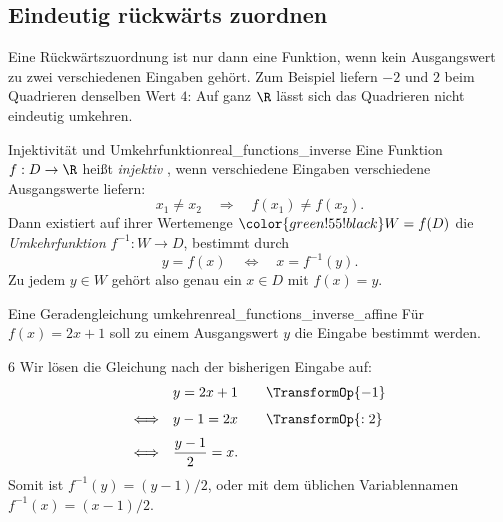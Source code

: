 \subsection{Eindeutig rückwärts zuordnen}
\label{subsec:real_functions_inverse_principle}
Eine Rückwärtszuordnung ist nur dann eine Funktion, wenn kein Ausgangswert
zu zwei verschiedenen Eingaben gehört. Zum Beispiel liefern $-2$ und $2$
beim Quadrieren denselben Wert $4$: Auf ganz $\R$ lässt sich das
Quadrieren nicht eindeutig umkehren.

\par\noindent\begin{minipage}{\linewidth}
\begin{FunctionPropertyBox}{Injektivität und Umkehrfunktion}{real_functions_inverse}
  Eine Funktion $f:D\to\R$ heißt \emph{injektiv} ,
  wenn verschiedene Eingaben verschiedene Ausgangswerte liefern:
  \[
    x_1\ne x_2\quad\Longrightarrow\quad f(x_1)\ne f(x_2).
  \]
  Dann existiert auf ihrer \textcolor{green!55!black}{Wertemenge} ${\color{green!55!black}W}=f(D)$ die
  \emph{Umkehrfunktion} 
  $f^{-1}:W\to D$, bestimmt durch
  \[
    y=f(x)\quad\Longleftrightarrow\quad x=f^{-1}(y).
  \]
  Zu jedem $y\in W$ gehört also genau ein $x\in D$ mit $f(x)=y$.
\end{FunctionPropertyBox}
\begin{ExampleBox}[before skip=0.3\baselineskip]{Eine Geradengleichung umkehren}{real_functions_inverse_affine}
  Für $f(x)=2x+1$ soll zu einem Ausgangswert $y$ die Eingabe bestimmt werden.
  \begin{ClozeArea}[34]{6}
    Wir lösen die Gleichung nach der bisherigen Eingabe auf:
    \[
      \begin{array}{r@{\quad}l@{\qquad}l}
        &y=2x+1&\TransformOp{-1}\\[0.7em]
        \Longleftrightarrow&y-1=2x&\TransformOp{:2}\\[0.7em]
        \Longleftrightarrow&\dfrac{y-1}{2}=x.&
      \end{array}
    \]
    Somit ist $f^{-1}(y)=(y-1)/2$, oder mit dem üblichen Variablennamen
    $f^{-1}(x)=(x-1)/2$.
  \end{ClozeArea}
\end{ExampleBox}
\end{minipage}

